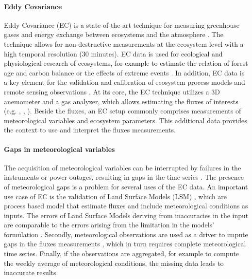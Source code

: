 \documentclass{article}
\begin{document}
\paragraph{Eddy Covariance} Eddy Covariance (EC) is a state-of-the-art technique for measuring greenhouse gases and energy exchange between ecosystems and the atmosphere \cite{aubinet_eddy_2012-1}.  The technique allows for non-destructive measurements at the ecosystem level with a high temporal resolution (30 minutes). EC data is used for ecological and physiological research of ecosystems, for example to estimate the relation of forest age and carbon balance \cite{besnard_quantifying_2018} or the effects of extreme events \cite{mahecha_detecting_2017}. In addition, EC data is a key element for the validation and calibration of ecosystem process models and remote sensing observations \cite{papale_ideas_2020}.
At its core, the EC technique utilizes a 3D anemometer and a gas analyzer, which allows estimating the fluxes of interests (e.g. , , ). Beside the fluxes, an EC setup commonly comprises measurements of meteorological variables and ecosystem parameters. This additional data provides the context to use and interpret the fluxes measurements.

\paragraph{Gaps in meteorological variables} The acquisition of  meteorological variables can be interrupted by failures in the instruments or power outages, resulting in gaps in the time series \cite{aubinet_eddy_2012-1}.
The presence of meteorological gaps is a problem for several uses of the EC data. An important use case of EC is the validation of Land Surface Models (LSM) \cite{balzarolo_evaluating_2014, friend_fluxnet_2007-1, bonan_improving_2011-1, kramer_evaluation_2002}, which are process based model that estimate fluxes and include meteorological conditions as inputs. The errors of Land Surface Models deriving from inaccuracies in the input are comparable to the errors arising from the limitation in the models' formulation \cite{zhao_how_2012}.
Secondly, meteorological observations are used as a driver to impute gaps in the fluxes measurements \cite{aubinet_eddy_2012-1}, which in turn requires complete meteorological time series.
Finally, if the observations are aggregated, for example to compute the weekly average of meteorological conditions, the missing data leads to inaccurate results.
\end{document}
